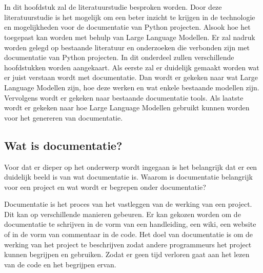 \chapter{}%
\label{ch:stand-van-zaken}



In dit hoofdstuk zal de literatuurstudie besproken worden. Door deze literatuurstudie is het mogelijk om een beter inzicht te krijgen in de technologie en mogelijkheden voor de documentatie van Python projecten. 
Alsook hoe het toegepast kan worden met behulp van Large Language Modellen. Er
zal nadruk worden gelegd op bestaande literatuur en onderzoeken die verbonden
zijn met documentatie van Python projecten. In dit onderdeel zullen verschillende hoofdstukken worden aangekaart. 
Als eerste zal er duidelijk gemaakt worden wat er juist verstaan wordt met documentatie. 
Dan wordt er gekeken naar wat Large Language Modellen zijn, hoe deze werken en wat enkele bestaande modellen zijn.
Vervolgens wordt er gekeken naar bestaande documentatie tools.
Als laatste wordt er gekeken naar hoe Large Language Modellen gebruikt kunnen worden voor het genereren van documentatie.

\section{Wat is documentatie?}
\label{sec:wat-is-documentatie}

Voor dat er dieper op het onderwerp wordt ingegaan is het belangrijk dat er een duidelijk beeld is van wat documentatie is. 
Waarom is documentatie belangrijk voor een project en wat wordt er begrepen onder documentatie? 

Documentatie is het proces van het vastleggen van de werking van een project.
Dit kan op verschillende manieren gebeuren. 
Er kan gekozen worden om de documentatie te schrijven in de vorm van een handleiding, een wiki, een website of in de vorm van commentaar in de code.
Het doel van documentatie is om de werking van het project te beschrijven zodat andere programmeurs het project kunnen begrijpen en gebruiken.
Zodat er geen tijd verloren gaat aan het lezen van de code en het begrijpen ervan.

